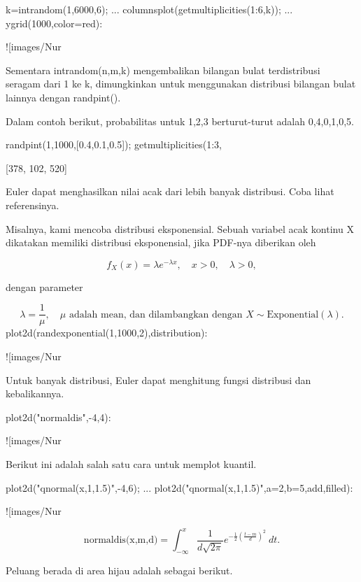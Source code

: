 \documentclass{article}
\begin{document}
\>k=intrandom(1,6000,6);  ...  
\>   columnsplot(getmultiplicities(1:6,k));  ...  
\>   ygrid(1000,color=red):


![images/Nur%

Sementara intrandom(n,m,k) mengembalikan bilangan bulat terdistribusi
seragam dari 1 ke k, dimungkinkan untuk menggunakan distribusi
bilangan bulat lainnya dengan randpint().


Dalam contoh berikut, probabilitas untuk 1,2,3 berturut-turut adalah
0,4,0,1,0,5.


\>randpint(1,1000,[0.4,0.1,0.5]); getmultiplicities(1:3,%


    [378,  102,  520]

Euler dapat menghasilkan nilai acak dari lebih banyak distribusi. Coba
lihat referensinya.


Misalnya, kami mencoba distribusi eksponensial. Sebuah variabel acak
kontinu X dikatakan memiliki distribusi eksponensial, jika PDF-nya
diberikan oleh


$$f_X(x)=\lambda e^{-\lambda x},\quad x>0,\quad \lambda>0,$$

dengan parameter


$$\lambda=\frac{1}{\mu},\quad \mu \text{ adalah mean, dan dilambangkan dengan } X \sim \text{Exponential}(\lambda).$$\>plot2d(randexponential(1,1000,2),\>distribution):


![images/Nur%

Untuk banyak distribusi, Euler dapat menghitung fungsi distribusi dan
kebalikannya.


\>plot2d("normaldis",-4,4): 


![images/Nur%

Berikut ini adalah salah satu cara untuk memplot kuantil.


\>plot2d("qnormal(x,1,1.5)",-4,6);  ...  
\>   plot2d("qnormal(x,1,1.5)",a=2,b=5,\>add,\>filled):


![images/Nur%

$$\text{normaldis(x,m,d)}=\int_{-\infty}^x \frac{1}{d\sqrt{2\pi}}e^{-\frac{1}{2}(\frac{t-m}{d})^2}\ dt.$$

Peluang berada di area hijau adalah sebagai berikut.
\end{document}
